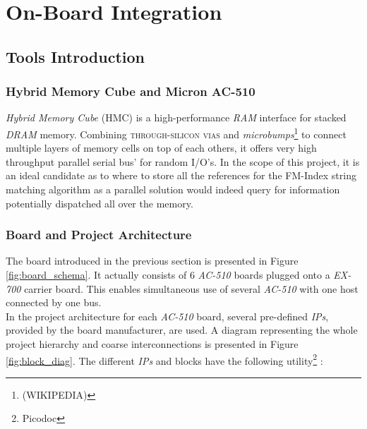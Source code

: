 
\chapter{On-Board Integration} %

\label{Chapter4} %


\section{Tools Introduction}

\subsection{Hybrid Memory Cube and Micron AC-510}


\textsl{Hybrid Memory Cube} (HMC) is a high-performance \textsl{RAM} interface for stacked \textsl{DRAM} memory. Combining \textsc{through-silicon vias} and \textsl{microbumps}\footnote{ (WIKIPEDIA) } to connect multiple layers of memory cells on top of each others, it offers very high throughput parallel serial bus' for random I/O's. In the scope of this project, it is an ideal candidate as to where to store all the references for the  FM-Index string matching algorithm as a parallel solution would indeed query for information potentially dispatched all over the memory.


\subsection{Board and Project Architecture}

The board introduced in the previous section is presented in Figure \ref{fig:board_schema}. It actually consists of 6 \textsl{AC-510} boards plugged onto a \textsl{EX-700} carrier board. This enables simultaneous use of several \textsl{AC-510} with one host connected by one bus. \\

In the project architecture for each \textsl{AC-510} board, several pre-defined \textsl{IPs}, provided by the board manufacturer, are used. A diagram representing the whole project hierarchy and coarse interconnections is presented in Figure \ref{fig:block_diag}. The different \textsl{IPs} and blocks have the following utility\footnote{Picodoc} :


